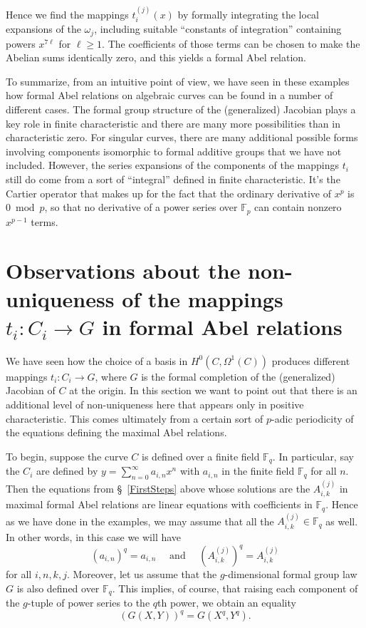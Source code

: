 \documentclass[12pt]{amsart}
\theoremstyle{theorem}
\newcommand{\FF}{\mathbb{F}}
\begin{document}
Hence we find
the mappings $t_i^{(j)}(x)$ by formally integrating the local expansions of the $\omega_j$, including suitable ``constants of integration''
containing powers $x^{7\ell}$ for $\ell \ge 1$.  The coefficients of those terms can be chosen to make the Abelian sums identically zero, and this
yields a formal Abel relation.  

To summarize, from an intuitive point of view, we have seen in these examples how formal Abel relations on algebraic
curves can be found in a number of different cases.  The formal group structure of the (generalized) Jacobian plays
a key role in finite characteristic and there are many more possibilities than in characteristic zero.  For singular
curves, there are many additional possible forms involving components isomorphic to formal additive groups that
we have not included.  However, the series expansions of the components of the mappings  
$t_i$ still do come from a sort of ``integral'' defined in finite characteristic.   It's the Cartier operator that makes up
for the fact that the ordinary derivative of  $x^p$ is $0 \bmod p$, 
so that no derivative of a power series over $\FF_p$ can contain nonzero $x^{p-1}$ terms. 

\section{Observations about the non-uniqueness of the mappings $t_i : C_i \to G$ in formal Abel relations}

We have seen how the choice of a basis in $H^0(C,\Omega^1(C))$ produces different mappings $t_i : C_i \to G$, 
where $G$ is the formal completion of the (generalized) Jacobian of $C$ at the origin.  In this section we
want to point out that there is an additional level of non-uniqueness here that appears only in positive characteristic.
This comes ultimately from a certain sort of $p$-adic periodicity of the equations defining the maximal Abel relations.

To begin, suppose the curve $C$ is defined over a finite field $\FF_q$.
In particular, say the $C_i$ are defined by $y = \sum_{n=0}^\infty a_{i,n} x^n$  with  $a_{i,n}$ in the finite field $\FF_q$ for all $n$.
Then the equations from \S~\ref{FirstSteps} above whose solutions are the $A_{i,k}^{(j)}$ in maximal formal Abel relations
are linear equations with coefficients in $\FF_q$.  Hence as we have done in the examples, we may assume that 
all the $A_{i,k}^{(j)} \in \FF_q$ as well.  In other words, in this case we will have
$$(a_{i,n})^q = a_{i,n} \quad \text{ and } \quad (A_{i,k}^{(j)})^q = A_{i,k}^{(j)}$$
for all $i, n, k, j$.   Moreover, let us assume that the $g$-dimensional formal group law $G$ is also defined over $\FF_q$.  This
implies, of course, that raising each component of the $g$-tuple of power series to the $q$th power, we obtain an equality
\begin{equation}
\label{GoverFq}
(G(X,Y))^q = G(X^q,Y^q).
\end{equation}
\end{document}
